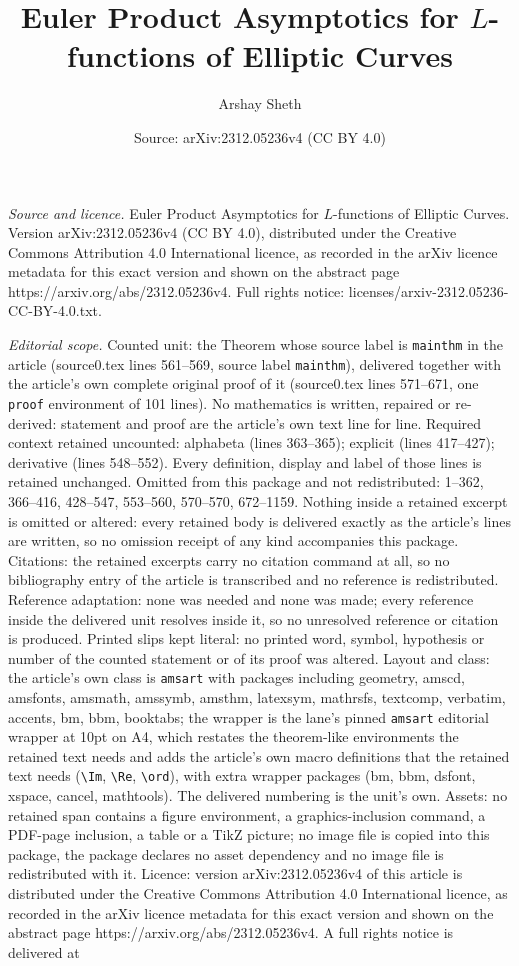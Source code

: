 \documentclass[10pt,a4paper]{amsart}
\title[Euler Product Asymptotics for $L$-functions of Elliptic Curv]{Euler Product Asymptotics for $L$-functions of Elliptic Curves}
\author{Arshay Sheth}
\date{Source: arXiv:2312.05236v4 (CC BY 4.0)}
\begin{document}
\maketitle

\noindent\emph{Source and licence.} Euler Product Asymptotics for $L$-functions of Elliptic Curves. Version arXiv:2312.05236v4 (CC BY 4.0), distributed under the Creative Commons Attribution 4.0 International licence, as recorded in the arXiv licence metadata for this exact version and shown on the abstract page https://arxiv.org/abs/2312.05236v4. Full rights notice: licenses/arxiv-2312.05236-CC-BY-4.0.txt.\par\smallskip

\noindent\textit{Editorial scope.} Counted unit: the Theorem whose source label is \texttt{mainthm} in the article (source0.tex lines 561--569, source label \texttt{mainthm}), delivered together with the article's own complete original proof of it (source0.tex lines 571--671, one \texttt{proof} environment of 101 lines). No mathematics is written, repaired or re-derived: statement and proof are the article's own text line for line. Required context retained uncounted: alphabeta (lines 363--365); explicit (lines 417--427); derivative (lines 548--552). Every definition, display and label of those lines is retained unchanged. Omitted from this package and not redistributed: 1--362, 366--416, 428--547, 553--560, 570--570, 672--1159. Nothing inside a retained excerpt is omitted or altered: every retained body is delivered exactly as the article's lines are written, so no omission receipt of any kind accompanies this package. Citations: the retained excerpts carry no citation command at all, so no bibliography entry of the article is transcribed and no reference is redistributed. Reference adaptation: none was needed and none was made; every reference inside the delivered unit resolves inside it, so no unresolved reference or citation is produced. Printed slips kept literal: no printed word, symbol, hypothesis or number of the counted statement or of its proof was altered. Layout and class: the article's own class is \texttt{amsart} with packages including geometry, amscd, amsfonts, amsmath, amssymb, amsthm, latexsym, mathrsfs, textcomp, verbatim, accents, bm, bbm, booktabs; the wrapper is the lane's pinned \texttt{amsart} editorial wrapper at 10pt on A4, which restates the theorem-like environments the retained text needs and adds the article's own macro definitions that the retained text needs (\texttt{\textbackslash Im}, \texttt{\textbackslash Re}, \texttt{\textbackslash ord}), with extra wrapper packages (bm, bbm, dsfont, xspace, cancel, mathtools). The delivered numbering is the unit's own. Assets: no retained span contains a figure environment, a graphics-inclusion command, a PDF-page inclusion, a table or a TikZ picture; no image file is copied into this package, the package declares no asset dependency and no image file is redistributed with it. Licence: version arXiv:2312.05236v4 of this article is distributed under the Creative Commons Attribution 4.0 International licence, as recorded in the arXiv licence metadata for this exact version and shown on the abstract page https://arxiv.org/abs/2312.05236v4. A full rights notice is delivered at 
\end{document}
